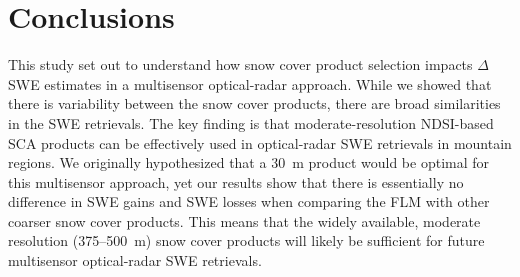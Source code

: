 \hypertarget{ch6-conclusions}{\section{Conclusions}\label{ch6-conclusions}}

This study set out to understand how snow cover product selection impacts $\Delta$SWE estimates in a multisensor optical-radar approach. While we showed that there is variability between the snow cover products, there are broad similarities in the SWE retrievals. The key finding is that moderate-resolution NDSI-based SCA products can be effectively used in optical-radar SWE retrievals in mountain regions. We originally hypothesized that a 30~m product would be optimal for this multisensor approach, yet our results show that there is essentially no difference in SWE gains and SWE losses when comparing the FLM with other coarser snow cover products. This means that the widely available, moderate resolution (375--500~m) snow cover products will likely be sufficient for future multisensor optical-radar SWE retrievals. 

\clearpage


